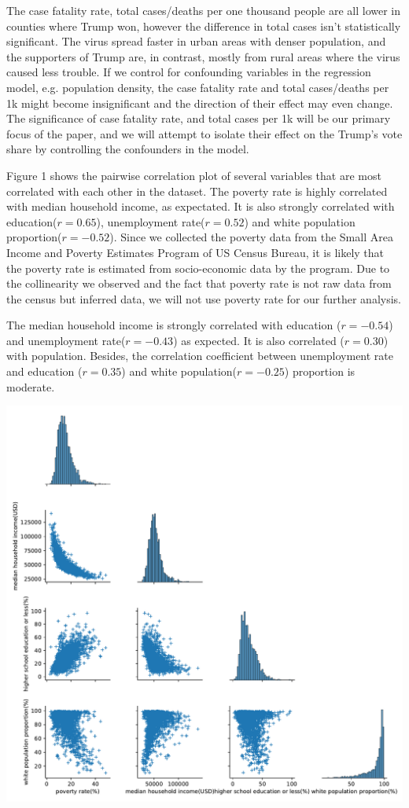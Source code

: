 \documentclass[12pt]{article}
\begin{document}
The case fatality rate, total cases/deaths per one thousand people are all lower in counties where Trump won, however the difference in total cases isn't statistically significant. The virus spread faster in urban areas with denser population, and the supporters of Trump are, in contrast,  mostly from rural areas where the virus caused less trouble. If we control for confounding variables in the regression model, e.g. population density, the case fatality rate and total cases/deaths per 1k might become insignificant and the direction of their effect may even change. The significance of case fatality rate, and total cases per 1k will be our primary focus of the paper, and we will attempt to isolate their effect on the Trump's vote share by controlling the confounders in the model.

Figure 1 shows the pairwise correlation plot of several variables that are most correlated with each other in the dataset. The poverty rate is highly correlated with median household income, as expectated. It is also strongly correlated with education($r=0.65$), unemployment rate($r=0.52$) and white population proportion($r=-0.52$). Since we collected the poverty data from the Small Area Income and Poverty Estimates Program of US Census Bureau, it is likely that the poverty rate is estimated from socio-economic data by the program. Due to the collinearity we observed and the fact that poverty rate is not raw data from the census but inferred data, we will not use poverty rate for our further analysis.

The median household income is strongly correlated with education ($r=-0.54$) and unemployment rate($r=-0.43$) as expected.  It is also correlated ($r=0.30$) with population. Besides, the correlation coefficient between unemployment rate and education ($r=0.35$) and white population($r=-0.25$) proportion is moderate.


\includegraphics[scale=0.6]{cor_plot.pdf}
\end{document}
